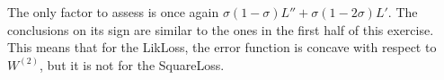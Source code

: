 \documentclass[fleqn]{report}
\begin{document}
The only factor to assess is once again $\sigma (1-\sigma) L'' + \sigma (1-2 \sigma) L'$. The conclusions on its sign are similar to the ones in the first half of this exercise. This means that for the LikLoss, the error function is concave with respect to $W^{(2)}$, but it is not for the SquareLoss.
\end{document}
